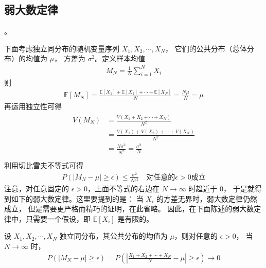 \documentclass[letterpaper,10pt,english]{sphinxmanual}
\begin{document}
\subsection{弱大数定律}
\label{\detokenize{_u63a8_u65ad_u4e0e_u68c0_u9a8c/content:id8}}
 。

下面考虑独立同分布的随机变量序列 \(X_1,X_2,\cdots,X_N\)，
它们的公共分布（总体分布）的均值为 \(\mu\)，
方差为 \(\sigma^2\)。定义样本均值
\begin{equation}\label{equation:推断与检验/content:推断与检验/content:28}
\begin{split}M_N = \frac{1}{N} \sum_{i=1}^N X_i\end{split}
\end{equation}
则
\begin{equation}\label{equation:推断与检验/content:推断与检验/content:29}
\begin{split}\mathbb{E}[M_N] = \frac{\mathbb{E}[X_1]+\mathbb{E}[X_2] + \cdots + \mathbb{E}[X_N] }{N}
= \frac{N \mu}{N} = \mu\end{split}
\end{equation}
再运用独立性可得
\begin{align}\label{equation:推断与检验/content:推断与检验/content:30}\!\begin{aligned}
V(M_N) &= \frac{V(X_1+X_2+\cdots+X_N)}{N^2}\\
&= \frac{V(X_1)+V(X_2)+\cdots + V(X_N)}{N^2}\\
&= \frac{N\sigma^2}{N^2} = \frac{\sigma^2}{N}\\
\end{aligned}\end{align}
利用切比雪夫不等式可得
\begin{equation}\label{equation:推断与检验/content:推断与检验/content:31}
\begin{split}P(|M_N - \mu| \geq \epsilon) \leq \frac{\sigma^2}{N \epsilon^2} \quad \text{对任意的} \epsilon >0 \text{成立}\end{split}
\end{equation}
注意，对任意固定的 \(\epsilon >0\)，上面不等式的右边在 \(N \rightarrow \infty\) 时趋近于 \(0\)，
于是就得到如下的弱大数定律。这里要提到的是：
当 \(X_i\) 的方差无界时，弱大数定律仍然成立，
但是需要更严格而精巧的证明，在此省略。
因此，在下面陈述的弱大数定律中，只需要一个假设，即 \(\mathbb{E}[X_i]\) 是有限的。

\begin{sphinxShadowBox}

设 \(X_1,X_2,\cdots,X_N\) 独立同分布，其公共分布的均值为 \(\mu\)，则对任意的 \(\epsilon >0\)，
当 \(N \rightarrow \infty\) 时，
\begin{equation}\label{equation:推断与检验/content:推断与检验/content:32}
\begin{split}P(|M_N - \mu| \geq \epsilon)=P\left( \left | \frac{X_1+X_2+\cdots+X_N}{N} -\mu \right | \geq \epsilon \right ) \rightarrow 0\end{split}
\end{equation}\end{sphinxShadowBox}
\end{document}
